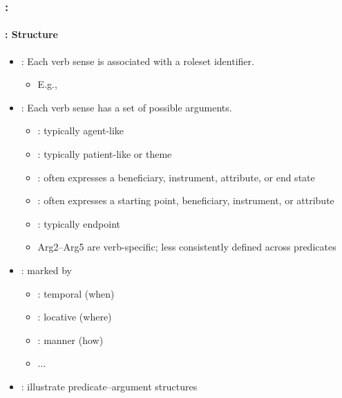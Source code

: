 \documentclass[xcolor=table]{beamer}
\begin{document}
\begin{frame}
	\frametitle{\insertshortsubtitle: \insertsection}
	\framesubtitle{\insertsubsection: Structure}
	
	\begin{itemize}
		\item {}: Each verb sense is associated with a roleset identifier.
		\begin{itemize}
			\item E.g., 
		\end{itemize}
		
		\item {}: Each verb sense has a set of possible arguments.
		\begin{itemize}
			\item {}: typically agent-like
			\item {}: typically patient-like or theme
			\item {}: often expresses a beneficiary, instrument, attribute, or end state
			\item {}: often expresses a starting point, beneficiary, instrument, or attribute
			\item {}: typically endpoint
			\item Arg2--Arg5 are verb-specific; less consistently defined across predicates
		\end{itemize}
		
		\item {}: marked by   
		\begin{itemize}
			\item {}: temporal (when)
			\item {}: locative (where)
			\item {}: manner (how)
			\item ...
		\end{itemize}
		
		\item {}: illustrate predicate--argument structures
	\end{itemize}
	
\end{frame}
\end{document}
